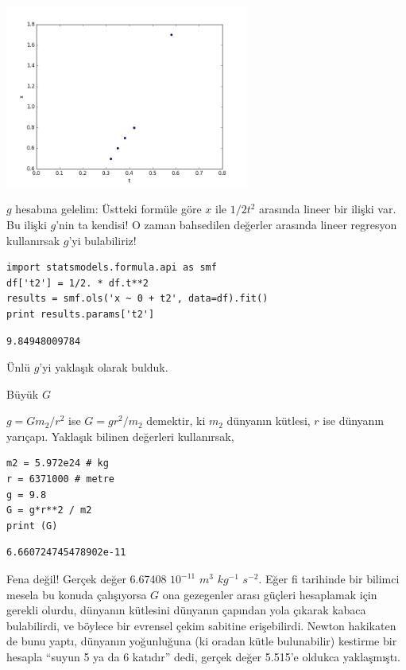 \documentclass[12pt,fleqn]{article}\usepackage{../../common}
\begin{document}
\includegraphics[height=6cm]{phy_005_basics_05.png}

$g$ hesabına gelelim: Üstteki formüle göre $x$ ile $1/2 t^2$ arasında
lineer bir ilişki var. Bu ilişki $g$'nin ta kendisi! O zaman bahsedilen
değerler arasında lineer regresyon kullanırsak $g$'yi bulabiliriz!

\begin{verbatim}
import statsmodels.formula.api as smf
df['t2'] = 1/2. * df.t**2
results = smf.ols('x ~ 0 + t2', data=df).fit()
print results.params['t2']
\end{verbatim}

\begin{verbatim}
9.84948009784
\end{verbatim}

Ünlü $g$'yi yaklaşık olarak bulduk.

Büyük $G$

$g = Gm_2 / r^2$ ise $G = g r^2 / m_2$ demektir, ki $m_2$ dünyanın kütlesi, $r$
ise dünyanın yarıçapı. Yaklaşık bilinen değerleri kullanırsak,

\begin{verbatim}
m2 = 5.972e24 # kg
r = 6371000 # metre
g = 9.8
G = g*r**2 / m2
print (G)
\end{verbatim}

\begin{verbatim}
6.660724745478902e-11
\end{verbatim}

Fena değil! Gerçek değer 6.67408 $10^{-11}$ $m^3$ $kg^{-1}$ $s^{-2}$. Eğer fi
tarihinde bir bilimci mesela bu konuda çalışıyorsa $G$ ona gezegenler arası
güçleri hesaplamak için gerekli olurdu, dünyanın kütlesini dünyanın çapından
yola çıkarak kabaca bulabilirdi, ve böylece bir evrensel çekim sabitine
erişebilirdi. Newton hakikaten de bunu yaptı, dünyanın yoğunluğuna (ki oradan
kütle bulunabilir) kestirme bir hesapla ``suyun 5 ya da 6 katıdır'' dedi, gerçek
değer 5.515'e oldukca yaklaşmıştı.
\end{document}
